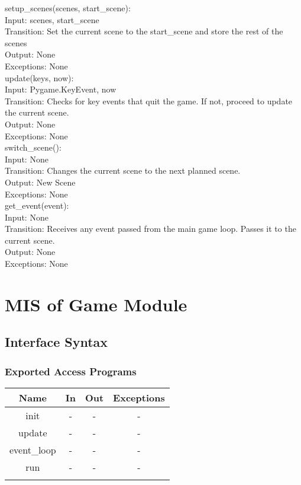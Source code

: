 \documentclass[12pt, titlepage]{article}
\begin{document}
setup\_scenes(scenes, start\_scene): \\
Input: scenes, start\_scene \\
Transition: Set the current scene to the start\_scene and store the rest of the scenes \\
Output: None \\
Exceptions: None \\

update(keys, now): \\
Input: Pygame.KeyEvent, now \\
Transition: Checks for key events that quit the game. If not, proceed to update the current scene. \\
Output: None \\
Exceptions: None \\

switch\_scene(): \\
Input: None \\
Transition: Changes the current scene to the next planned scene. \\
Output: New Scene \\
Exceptions: None \\

get\_event(event): \\
Input: None \\
Transition: Receives any event passed from the main game loop. Passes it to the current scene. \\
Output: None \\
Exceptions: None \\


\section{MIS of Game Module}
\subsection{Interface Syntax}
\subsubsection{Exported Access Programs}
\begin{tabular}[pos]{|c|c|c|c|}
\hline
\textbf{Name}& \textbf{In} & \textbf{Out} & \textbf{Exceptions} \\ \hline
init & - & - & -\\ \hline
 update & - & - & -\\ \hline
 event\_loop& - & - & -\\ \hline
 run & - & - & -\\ \hline
 &  &  & \\ \hline
\end{tabular}
\end{document}

